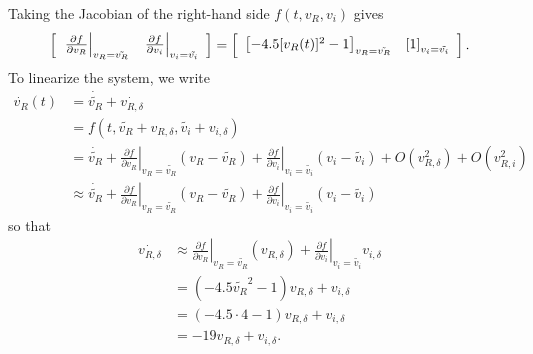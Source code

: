 \documentclass{article}
\begin{document}
Taking the Jacobian of the right-hand side $f(t, v_R, v_i)$ gives
\begin{align*}
\left[\begin{array}{c c}
  \left.\frac{\partial f}{\partial v_R}\right|_{v_R = \tilde{v_R}} 
& \left.\frac{\partial f}{\partial v_i}\right|_{v_i = \tilde{v_i}}
\end{array}\right]
&=
\left[\begin{array}{c c}
  \left[-4.5 [v_R(t)]^2 - 1\right]_{v_R = \tilde{v_R}} 
& \left[1\right]_{v_i = \tilde{v_i}}
\end{array}\right]. \\
\end{align*}
To linearize the system, we write
\begin{align*}
\dot{v_R}(t) 
  &=
     \dot{\tilde{v_R}}
   + \dot{v_{R,\delta}} \\
  &= f(t, 
       \tilde{v_R} + v_{R,\delta},
       \tilde{v_i} + v_{i,\delta}) \\
  &=
     \dot{\tilde{v_{R}}}
   + \left.\frac{\partial f}{\partial v_R}\right|_{v_R = \tilde{v_R}}
       (v_R - \tilde{v_R})
   + \left.\frac{\partial f}{\partial v_i}\right|_{v_i = \tilde{v_i}}
       (v_i - \tilde{v_i})
   + O(v_{R,\delta}^2) + O(v_{R,i}^2) \\
  &\approx
    \dot{\tilde{v_{R}}}
     + \left.\frac{\partial f}{\partial v_R}\right|_{v_R = \tilde{v_R}}
         (v_R - \tilde{v_R})
     + \left.\frac{\partial f}{\partial v_i}\right|_{v_i = \tilde{v_i}}
         (v_i - \tilde{v_i})
\end{align*}
so that
\begin{align*}
\dot{v_{R,\delta}} 
  &\approx
     \left.\frac{\partial f}{\partial v_R}\right|_{v_R = \tilde{v_R}}
       (v_{R,\delta})
   + \left.\frac{\partial f}{\partial v_i}\right|_{v_i = \tilde{v_i}}
       v_{i,\delta} \\
  &= (-4.5 \tilde{v_R}^2 - 1)v_{R,\delta}
   + v_{i,\delta} \\
  &= (-4.5 \cdot 4 - 1)v_{R,\delta} + v_{i,\delta} \\
  &= -19 v_{R, \delta} + v_{i, \delta}.
\end{align*}

\pagebreak
\end{document}
